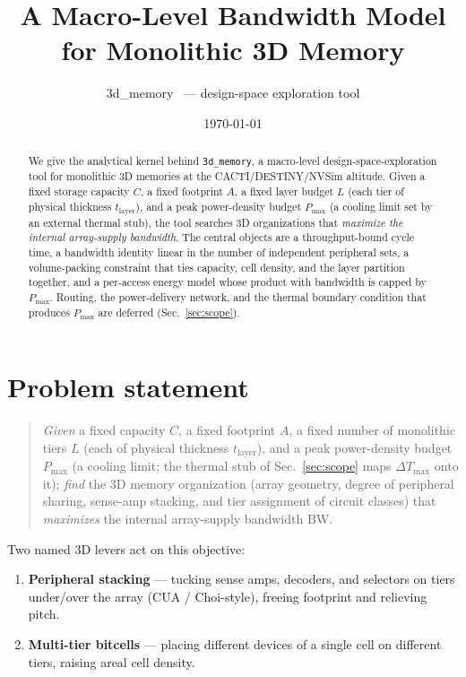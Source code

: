 \documentclass[11pt]{article}
\title{A Macro-Level Bandwidth Model for Monolithic 3D Memory}
\author{3d\_memory \, --- design-space exploration tool}
\date{\today}
\newcommand{\Pmax}{P_{\max}}
\newcommand{\tlayer}{t_{\mathrm{layer}}}
\begin{document}
\maketitle

\begin{abstract}
We give the analytical kernel behind \texttt{3d\_memory}, a macro-level
design-space-exploration tool for monolithic 3D memories at the
CACTI/DESTINY/NVSim altitude. Given a fixed storage capacity $C$, a fixed
footprint $A$, a fixed layer budget $L$ (each tier of physical thickness
$\tlayer$), and a peak power-density budget $\Pmax$ (a cooling limit set by an
external thermal stub), the tool searches 3D organizations that
\emph{maximize the internal array-supply bandwidth}. The central objects are a
throughput-bound cycle time, a bandwidth identity linear in the number of
independent peripheral sets, a volume-packing constraint that ties capacity,
cell density, and the layer partition together, and a per-access energy model
whose product with bandwidth is capped by $\Pmax$. Routing, the power-delivery
network, and the thermal boundary condition that produces $\Pmax$ are deferred
(Sec.~\ref{sec:scope}).
\end{abstract}

\section{Problem statement}
\label{sec:problem}

\begin{quote}
\emph{Given} a fixed capacity $C$, a fixed footprint $A$, a fixed number of
monolithic tiers $L$ (each of physical thickness $\tlayer$), and a peak
power-density budget $\Pmax$ (a cooling limit; the thermal stub of
Sec.~\ref{sec:scope} maps $\Delta T_{\max}$ onto it);
\emph{find} the 3D memory organization (array geometry, degree of peripheral
sharing, sense-amp stacking, and tier assignment of circuit classes) that
\emph{maximizes} the internal array-supply bandwidth $\mathrm{BW}$.
\end{quote}

Two named 3D levers act on this objective:
\begin{enumerate}[nosep]
  \item \textbf{Peripheral stacking} --- tucking sense amps, decoders, and
        selectors on tiers under/over the array (CUA / Choi-style), freeing
        footprint and relieving pitch.
  \item \textbf{Multi-tier bitcells} --- placing different devices of a single
        cell on different tiers, raising areal cell density.
\end{enumerate}
\end{document}
